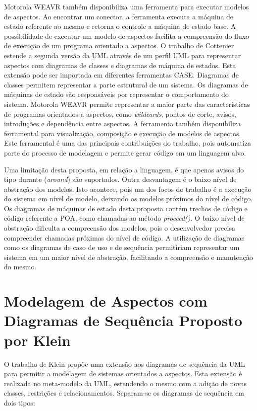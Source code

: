 Motorola WEAVR também disponibiliza uma ferramenta para executar modelos de aspectos. Ao encontrar um conector, a ferramenta executa a máquina de
estado referente ao mesmo e retorna o controle a máquina de estado base. A possibilidade de executar um modelo de aspectos facilita a compreensão do
fluxo de execução de um programa orientado a aspectos. O trabalho de Cottenier estende a segunda versão da UML através de um perfil UML para
representar aspectos com diagramas de classes e diagramas de máquina de estados. Esta extensão pode ser importada em diferentes ferramentas CASE. 
Diagramas de classes permitem representar a parte estrutural de um sistema. Os diagramas de máquinas de estado são responsáveis por representar
o comportamento do sistema. Motorola WEAVR permite representar a maior parte das características de programas orientados a aspectos, como
\textit{wildcards}, pontos de corte, avisos, introduções e dependência entre aspectos. A ferramenta também disponibiliza ferramental para visualização, composição e execução de modelos de aspectos. Este ferramental é uma das principais contribuições do trabalho, pois automatiza parte do processo de modelagem e
permite gerar código em um linguagem alvo.

Uma limitação desta proposta, em relação a linguagem, é que apenas avisos do tipo durante (\textit{around}) são suportados. Outra desvantagem é o baixo nível 
de abstração dos modelos. Isto acontece, pois um dos focos do trabalho é a execução do sistema em nível de modelo, deixando os modelos  próximos do
nível de código. Os diagramas de máquinas de estado desta proposta contém trechos de código e código referente a POA, como chamadas ao método \textit{proceed()}. 
O baixo nível de abstração dificulta a compreensão dos modelos, pois o desenvolvedor precisa compreender chamadas próximas do nível de código. A
utilização de diagramas como os diagramas de caso de uso e de sequência permitiriam representar um sistema em um maior nível de abstração, facilitando a compreensão 
e manutenção do mesmo. 

\section{Modelagem de Aspectos com Diagramas de Sequência Proposto por Klein}

O trabalho de Klein \cite{Klein:2007:WMA:1805812.1805819} \cite{Klein:2006:SWS:1119655.1119662} propõe uma extensão aos diagramas de sequência da UML para permitir a modelagem
de sistemas orientados a aspectos. Esta extensão é realizada no meta-modelo da UML, estendendo o mesmo com a adição de novas classes, restrições e
relacionamentos. Separam-se os diagramas de sequência em dois tipos:

